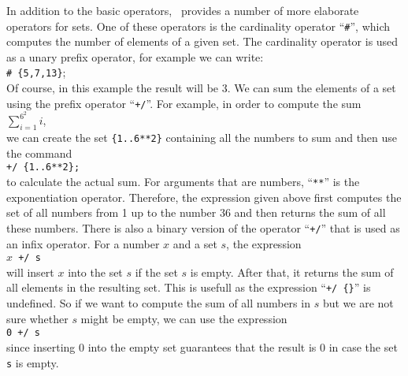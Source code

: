 In addition to the basic operators,
\setlx\ provides a number of more elaborate operators for sets.  One of these operators is
the cardinality operator ``\texttt{\#}'', which computes the number of elements of a 
given set.  The cardinality operator is used as a unary prefix operator, for example we can write:
\\[0.2cm]
\hspace*{1.3cm}
\texttt{\# \{5,7,13\}};
\\[0.2cm]
Of course, in this example the result will be $3$.
We can sum the elements of a set using the prefix operator
``\texttt{+/}''.  For example, in order to
compute the sum 
\\[0.2cm]
\hspace*{1.3cm}
$\sum\limits_{i=1}^{6^2} i$,
\\[0.2cm]
we can create the set \texttt{\{1..6**2\}} containing all the numbers
to sum and then use the command
\\[0.2cm]
\hspace*{1.3cm}
\texttt{+/ \{1..6**2\}; }
\\[0.2cm]
to calculate the actual sum.
For arguments that are numbers, ``\texttt{**}'' is the exponentiation operator.
Therefore, the expression given above 
first computes the set of all numbers from 1 up to the number 36 and then returns the sum
of all these numbers.  There is also a binary version of the operator ``\texttt{+/}'' that
is used as an infix operator.  For a number $x$ and a set $s$, the expression
\\[0.2cm]
\hspace*{1.3cm}
\texttt{$x$ +/ s}
\\[0.2cm]
will insert $x$ into the set $s$ if the set $s$ is empty.  After that, it returns the sum of all elements in the
resulting set.  This is usefull as the expression ``\texttt{+/ \{\}}'' is undefined.  So
if we want to compute the sum of all numbers in $s$ but we are not sure whether $s$ might
be empty, we can use the expression
\\[0.2cm]
\hspace*{1.3cm}
\texttt{0 +/ s}
\\[0.2cm]
since inserting $0$ into the empty set guarantees that the result is 0 in case  the set
\texttt{s} is empty.

